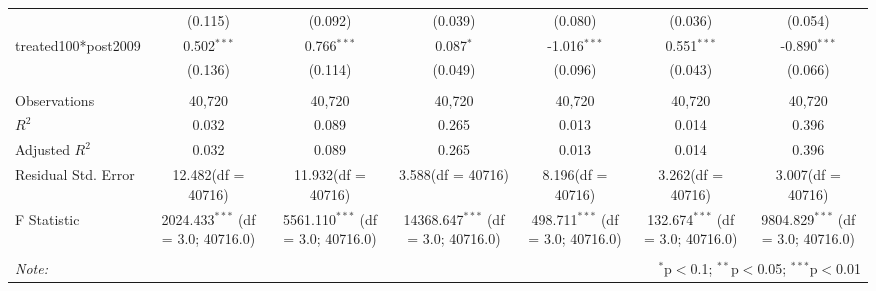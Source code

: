 \documentclass[12pt]{article}
\begin{document}
\begin{table}[!htbp]
\begin{tabular}{@{\extracolsep{5pt}}lcccccc}
  & (0.115) & (0.092) & (0.039) & (0.080) & (0.036) & (0.054) \\
 treated100*post2009 & 0.502$^{***}$ & 0.766$^{***}$ & 0.087$^{*}$ & -1.016$^{***}$ & 0.551$^{***}$ & -0.890$^{***}$ \\
  & (0.136) & (0.114) & (0.049) & (0.096) & (0.043) & (0.066) \\
\hline \\[-1.8ex]
 Observations & 40,720 & 40,720 & 40,720 & 40,720 & 40,720 & 40,720 \\
 $R^2$ & 0.032 & 0.089 & 0.265 & 0.013 & 0.014 & 0.396 \\
 Adjusted $R^2$ & 0.032 & 0.089 & 0.265 & 0.013 & 0.014 & 0.396 \\
 Residual Std. Error & 12.482(df = 40716) & 11.932(df = 40716) & 3.588(df = 40716) & 8.196(df = 40716) & 3.262(df = 40716) & 3.007(df = 40716)  \\
 F Statistic & 2024.433$^{***}$ (df = 3.0; 40716.0) & 5561.110$^{***}$ (df = 3.0; 40716.0) & 14368.647$^{***}$ (df = 3.0; 40716.0) & 498.711$^{***}$ (df = 3.0; 40716.0) & 132.674$^{***}$ (df = 3.0; 40716.0) & 9804.829$^{***}$ (df = 3.0; 40716.0) \\
\hline
\hline \\[-1.8ex]
\textit{Note:} & \multicolumn{6}{r}{$^{*}$p$<$0.1; $^{**}$p$<$0.05; $^{***}$p$<$0.01} \\
\end{tabular}
\end{table}
\end{document}
